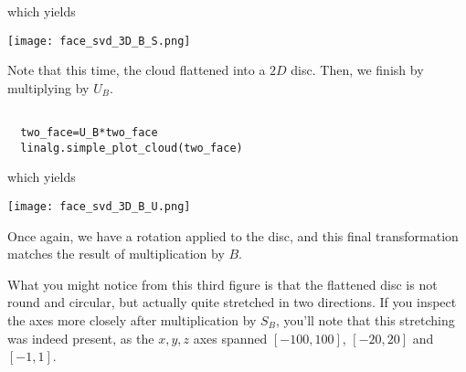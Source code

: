 \documentclass{ximera}
\begin{document}
which yields

\begin{center}
  \texttt{[image: face\_svd\_3D\_B\_S.png]}
\end{center}

Note that this time, the cloud flattened into a $2D$ disc. Then, we finish by multiplying by $U_B$.

\begin{verbatim}

  two_face=U_B*two_face
  linalg.simple_plot_cloud(two_face)

\end{verbatim}

which yields

\begin{center}
  \texttt{[image: face\_svd\_3D\_B\_U.png]}
\end{center}

Once again, we have a rotation applied to the disc, and this final transformation matches the result of multiplication by $B$.

What you might notice from this third figure is that the flattened disc is not round and circular, but actually quite stretched in two directions. If you inspect the axes more closely after multiplication by $S_B$, you'll note that this stretching was indeed present, as the $x,y,z$ axes spanned $[-100,100]$, $[-20,20]$ and $[-1,1]$.
\end{document}
